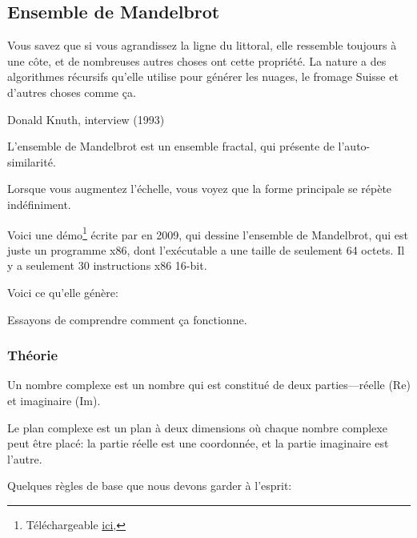 \clearpage
\subsection{Ensemble de Mandelbrot}
\label{Mandelbrot_demo}

\epigraph{Vous savez que si vous agrandissez la ligne du littoral, elle ressemble
toujours à une côte, et de nombreuses autres choses ont cette propriété. La nature
a des algorithmes récursifs qu'elle utilise pour générer les nuages, le fromage
Suisse et d'autres choses comme ça.}
{Donald Knuth, interview (1993)}

L'ensemble de Mandelbrot est un ensemble fractal, qui présente de l'auto-similarité.

Lorsque vous augmentez l'échelle, vous voyez que la forme principale se répète indéfiniment.

Voici une démo\footnote{Téléchargeable \href{http://go.yurichev.com/17306} {ici},}
écrite par  en 2009, qui dessine l'ensemble de Mandelbrot, qui est
juste un programme x86, dont l'exécutable a une taille de seulement 64 octets.
Il y a seulement 30 instructions x86 16-bit.

Voici ce qu'elle génère:

\begin{figure}[H]
\centering
{}
\end{figure}

Essayons de comprendre comment ça fonctionne.

\subsubsection{Théorie}


Un nombre complexe est un nombre qui est constitué de deux parties---réelle (Re) et
imaginaire (Im).


Le plan complexe est un plan à deux dimensions où chaque nombre complexe peut être
placé: la partie réelle est une coordonnée, et la partie imaginaire est l'autre.

Quelques règles de base que nous devons garder à l'esprit:

